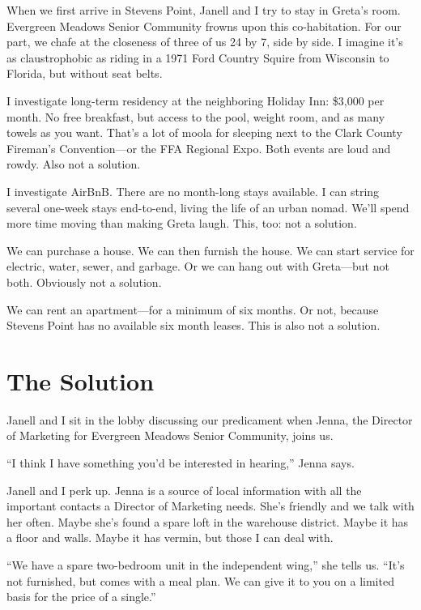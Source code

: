 \documentclass[
  letterpaper,
  DIV=11,
  numbers=noendperiod]{scrreprt}
\begin{document}

When we first arrive in Stevens Point, Janell and I try to stay in
Greta's room. Evergreen Meadows Senior Community frowns upon this
co-habitation. For our part, we chafe at the closeness of three of us 24
by 7, side by side. I imagine it's as claustrophobic as riding in a 1971
Ford Country Squire from Wisconsin to Florida, but without seat belts.

I investigate long-term residency at the neighboring Holiday Inn:
\$3,000 per month. No free breakfast, but access to the pool, weight
room, and as many towels as you want. That's a lot of moola for sleeping
next to the Clark County Fireman's Convention---or the FFA Regional
Expo. Both events are loud and rowdy. Also not a solution.

I investigate AirBnB. There are no month-long stays available. I can
string several one-week stays end-to-end, living the life of an urban
nomad. We'll spend more time moving than making Greta laugh. This, too:
not a solution.

We can purchase a house. We can then furnish the house. We can start
service for electric, water, sewer, and garbage. Or we can hang out with
Greta---but not both. Obviously not a solution.

We can rent an apartment---for a minimum of six months. Or not, because
Stevens Point has no available six month leases. This is also not a
solution.

\section*{\texorpdfstring{\textbf{The
Solution}}{The Solution}}\label{the-solution}


Janell and I sit in the lobby discussing our predicament when Jenna, the
Director of Marketing for Evergreen Meadows Senior Community, joins us.

``I think I have something you'd be interested in hearing,'' Jenna says.

Janell and I perk up. Jenna is a source of local information with all
the important contacts a Director of Marketing needs. She's friendly and
we talk with her often. Maybe she's found a spare loft in the warehouse
district. Maybe it has a floor and walls. Maybe it has vermin, but those
I can deal with.

``We have a spare two-bedroom unit in the independent wing,'' she tells
us. ``It's not furnished, but comes with a meal plan. We can give it to
you on a limited basis for the price of a single.''
\end{document}
